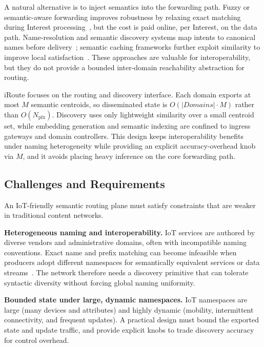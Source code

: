 \documentclass[journal]{IEEEtran}
\begin{document}
A natural alternative is to inject semantics into the forwarding path.
Fuzzy or semantic-aware forwarding improves robustness by relaxing exact matching during Interest processing~\cite{fuzzy_forwarding,amadeo2025saf,dt_vndn_semantic}, but the cost is paid online, per Interest, on the data path.
Name-resolution and semantic discovery systems map intents to canonical names before delivery~\cite{grewe2018sodi,antunes2022context}; semantic caching frameworks further exploit similarity to improve local satisfaction~\cite{sanr_cmf,iscc}.
These approaches are valuable for interoperability, but they do not provide a bounded inter-domain reachability abstraction for routing.

iRoute focuses on the routing and discovery interface.
Each domain exports at most $M$ semantic centroids, so disseminated state is $O(|Domains|\cdot M)$ rather than $O(N_{\text{pfx}})$.
Discovery uses only lightweight similarity over a small centroid set, while embedding generation and semantic indexing are confined to ingress gateways and domain controllers.
This design keeps interoperability benefits under naming heterogeneity while providing an explicit accuracy-overhead knob via $M$, and it avoids placing heavy inference on the core forwarding path.

\subsection{Challenges and Requirements}
\label{sec:bg_requirements}

An IoT-friendly semantic routing plane must satisfy constraints that are weaker in traditional content networks.

\textbf{Heterogeneous naming and interoperability.}
IoT services are authored by diverse vendors and administrative domains, often with incompatible naming conventions.
Exact name and prefix matching can become infeasible when producers adopt different namespaces for semantically equivalent services or data streams~\cite{amadeo2025saf,dt_vndn_semantic}.
The network therefore needs a discovery primitive that can tolerate syntactic diversity without forcing global naming uniformity.

\textbf{Bounded state under large, dynamic namespaces.}
IoT namespaces are large (many devices and attributes) and highly dynamic (mobility, intermittent connectivity, and frequent updates).
A practical design must bound the exported state and update traffic, and provide explicit knobs to trade discovery accuracy for control overhead.
\end{document}
